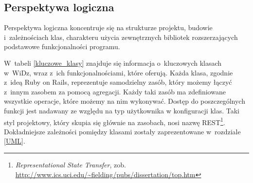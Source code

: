 \documentclass[12pt,leqno,twoside]{mwart}
\begin{document}
\subsection{Perspektywa logiczna}
\noindent Perspektywa logiczna koncentruje się na strukturze projektu, budowie i~zależnościach klas, charakteru użycia zewnętrznych bibliotek rozszerzających podstawowe funkcjonalności programu.%

\indent W~tabeli \ref{kluczowe_klasy} znajduje się informacja o~kluczowych klasach w~WiDz, wraz z~ich funkcjonalnościami, które oferują. Każda klasa, zgodnie z~ideą Ruby on Rails, reprezentuje samodzielny zasób, który możemy łączyć z~innym zasobem za pomocą agregacji. Każdy taki zasób ma zdefiniowane wszystkie operacje, które możemy na nim wykonywać. Dostęp do poszczególnych funkcji jest nadawany ze względu na typ użytkownika w konfiguracji klas. Taki styl projektowy, który skupia się głównie na zasobach, nosi nazwę REST\footnote{\textit{Representational State Transfer}, zob. \url{http://www.ics.uci.edu/~fielding/pubs/dissertation/top.htm}}. Dokładniejsze zależności pomiędzy klasami zostały zaprezentowane w~rozdziale \ref{UML}.
\end{document}
